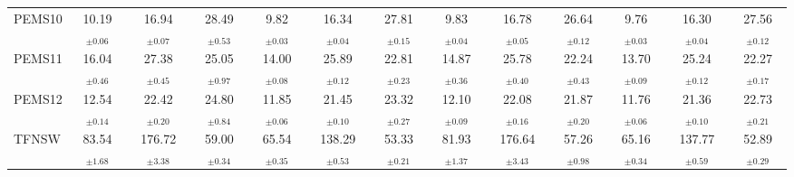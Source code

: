 \begin{table}[t]
{\begin{tabular}{l|ccc|ccc|ccc|ccc}
PEMS10 & 10.19$_{\pm0.06}$ & 16.94$_{\pm0.07}$ & 28.49$_{\pm0.53}$ & 9.82$_{\pm0.03}$ & 16.34$_{\pm0.04}$ & 27.81$_{\pm0.15}$ & 9.83$_{\pm0.04}$ & 16.78$_{\pm0.05}$ & 26.64$_{\pm0.12}$ & 9.76$_{\pm0.03}$ & 16.30$_{\pm0.04}$ & 27.56$_{\pm0.12}$ \\
PEMS11 & 16.04$_{\pm0.46}$ & 27.38$_{\pm0.45}$ & 25.05$_{\pm0.97}$ & 14.00$_{\pm0.08}$ & 25.89$_{\pm0.12}$ & 22.81$_{\pm0.23}$ & 14.87$_{\pm0.36}$ & 25.78$_{\pm0.40}$ & 22.24$_{\pm0.43}$ & 13.70$_{\pm0.09}$ & 25.24$_{\pm0.12}$ & 22.27$_{\pm0.17}$ \\
PEMS12 & 12.54$_{\pm0.14}$ & 22.42$_{\pm0.20}$ & 24.80$_{\pm0.84}$ & 11.85$_{\pm0.06}$ & 21.45$_{\pm0.10}$ & 23.32$_{\pm0.27}$ & 12.10$_{\pm0.09}$ & 22.08$_{\pm0.16}$ & 21.87$_{\pm0.20}$ & 11.76$_{\pm0.06}$ & 21.36$_{\pm0.10}$ & 22.73$_{\pm0.21}$ \\
TFNSW & 83.54$_{\pm1.68}$ & 176.72$_{\pm3.38}$ & 59.00$_{\pm0.34}$ & 65.54$_{\pm0.35}$ & 138.29$_{\pm0.53}$ & 53.33$_{\pm0.21}$ & 81.93$_{\pm1.37}$ & 176.64$_{\pm3.43}$ & 57.26$_{\pm0.98}$ & 65.16$_{\pm0.34}$ & 137.77$_{\pm0.59}$ & 52.89$_{\pm0.29}$ \\
\bottomrule
\end{tabular}}
\end{table}
